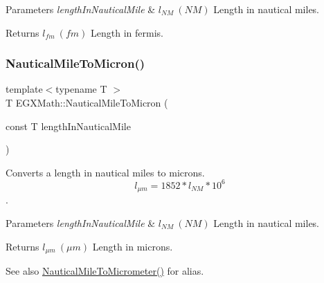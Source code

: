 \begin{DoxyParams}{Parameters}
{\em length\+In\+Nautical\+Mile} & $ l_{NM}\ (NM)$ Length in nautical miles. \\
\hline
\end{DoxyParams}
\begin{DoxyReturn}{Returns}
$ l_{fm}\ (fm)$ Length in fermis. 
\end{DoxyReturn}
\mbox{\label{group___e_g_x_math-_conversions-_length_conversions-_nautical-_nautical_mile-_non-_s_i_gad80a4f8f82660ad19a420e55bfb33447}} 
\subsubsection{\texorpdfstring{Nautical\+Mile\+To\+Micron()}{NauticalMileToMicron()}}
{\footnotesize\ttfamily template$<$typename T $>$ \\
T E\+G\+X\+Math\+::\+Nautical\+Mile\+To\+Micron (\begin{DoxyParamCaption}\item[{const T}]{length\+In\+Nautical\+Mile }\end{DoxyParamCaption})}



Converts a length in nautical miles to microns. \[ l_{\mu m}=1852 * l_{NM} * 10^{6} \]. 


\begin{DoxyParams}{Parameters}
{\em length\+In\+Nautical\+Mile} & $ l_{NM}\ (NM)$ Length in nautical miles. \\
\hline
\end{DoxyParams}
\begin{DoxyReturn}{Returns}
$ l_{\mu m}\ (\mu m)$ Length in microns. 
\end{DoxyReturn}
\begin{DoxySeeAlso}{See also}
\mbox{\hyperlink{group___e_g_x_math-_conversions-_length_conversions-_nautical-_nautical_mile-_s_i_ga8ce271a279676a3461dddc59c6a9720b}{Nautical\+Mile\+To\+Micrometer()}} for alias. 
\end{DoxySeeAlso}
\mbox{\label{group___e_g_x_math-_conversions-_length_conversions-_nautical-_nautical_mile-_non-_s_i_ga17cfe98568d00c2e0b1c0b5d19f1b34e}} 
